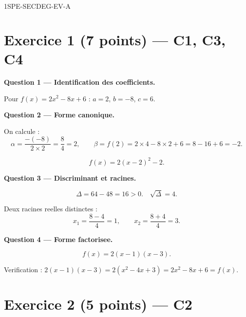\begin{corrige}{1SPE-SECDEG-EV-A}

\section*{Exercice 1 \hfill (7 points) — C1, C3, C4}


\bigskip
\textbf{Question 1 — Identification des coefficients.}


Pour $f(x) = 2x^2 - 8x + 6$ : $a = 2$, $b = -8$, $c = 6$.

\medskip
\textbf{Question 2 — Forme canonique.}


On calcule :
\[
\alpha = \frac{-(-8)}{2 \times 2} = \frac{8}{4} = 2, \qquad
\beta = f(2) = 2 \times 4 - 8 \times 2 + 6 = 8 - 16 + 6 = -2.
\]

\[
\boxed{f(x) = 2(x-2)^2 - 2.}
\]

\medskip
\textbf{Question 3 — Discriminant et racines.}


\[
\Delta = 64 - 48 = 16 > 0. \quad \sqrt{\Delta} = 4.
\]

Deux racines reelles distinctes :
\[
x_1 = \frac{8 - 4}{4} = 1, \qquad x_2 = \frac{8 + 4}{4} = 3.
\]

\medskip
\textbf{Question 4 — Forme factorisee.}


\[
\boxed{f(x) = 2(x-1)(x-3).}
\]

Verification : $2(x-1)(x-3) = 2(x^2 - 4x + 3) = 2x^2 - 8x + 6 = f(x)$. \checkmark

\section*{Exercice 2 \hfill (5 points) — C2}


\end{corrige}
